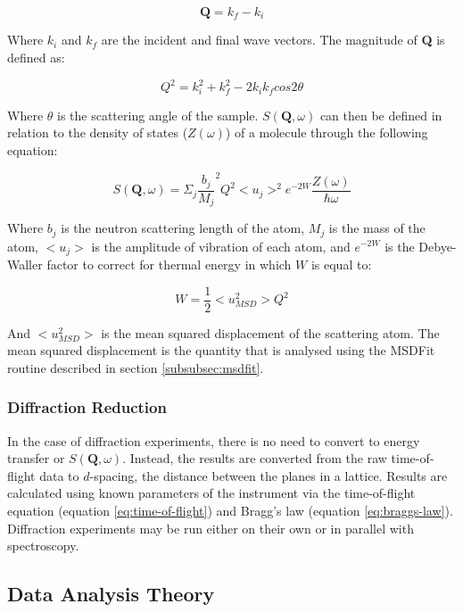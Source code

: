 \documentclass[paper=a4, fontsize=11pt]{scrartcl}	%
\numberwithin{equation}{section}															%
\numberwithin{figure}{section}																%
\numberwithin{table}{section}																%
\begin{document}
\begin{equation}
\mathbf{Q} = k_f - k_i
\end{equation}

Where $k_i$ and $k_f$ are the incident and final wave vectors. The magnitude of \textbf{Q} is defined as:

\begin{equation}
Q^2 = k_i^2 + k_f^2 - 2k_ik_fcos 2\theta
\end{equation}

Where $\theta$ is the scattering angle of the sample. $S(\mathbf{Q}, \omega)$ can then be defined in relation to the density of states ($Z(\omega)$) of a molecule through the following equation:

\begin{equation}
S(\mathbf{Q}, \omega) = \Sigma_j \frac{b_j}{M_j}^2Q^2 < u_j >^2 e^{-2W}\frac{Z(\omega)}{\hbar\omega}
\end{equation}

Where $b_j$ is the neutron scattering length of the atom, $M_j$ is the mass of the atom, $< u_j >$ is the amplitude of vibration of each atom, and $e^{-2W}$ is the Debye-Waller factor \cite{smukhopadhyay2014}  to correct for thermal energy in which $W$ is equal to:

\begin{equation}
W = \frac{1}{2} < u^2_{MSD} > Q^2
\end{equation}

And $< u^2_{MSD} >$ is the mean squared displacement of the scattering atom. The mean squared displacement is the quantity that is analysed using the MSDFit routine described in section \ref{subsubsec:msdfit}.

\subsubsection{Diffraction Reduction}
In the case of diffraction experiments, there is no need to convert to energy transfer or $S(\mathbf{Q}, \omega)$. Instead, the results are converted from the raw time-of-flight data to $d$-spacing, the distance between the planes in a lattice. Results are calculated using known parameters of the instrument via the time-of-flight equation (equation \ref{eq:time-of-flight}) and Bragg's law (equation \ref{eq:braggs-law}). Diffraction experiments may be run either on their own or in parallel with spectroscopy.

\subsection{Data Analysis Theory}
\end{document}
